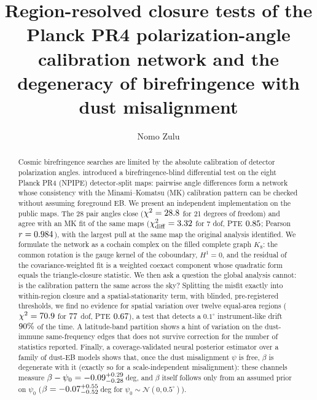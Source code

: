 \documentclass[twocolumn]{aastex631}
\begin{document}
\title{Region-resolved closure tests of the Planck PR4 polarization-angle calibration network and the degeneracy of birefringence with dust misalignment}

\author{Nomo Zulu}

\begin{abstract}
Cosmic birefringence searches are limited by the absolute calibration of detector polarization
angles. \citet{lka2026} introduced a birefringence-blind differential test on the eight Planck PR4
(NPIPE) detector-split maps: pairwise angle differences form a network whose consistency with the
Minami--Komatsu (MK) calibration pattern can be checked without assuming foreground EB.
We present an independent implementation on the public maps. The 28 pair angles close
($\chi^2=28.8$ for 21 degrees of freedom) and agree with an MK fit of the same maps
($\chi^2_{\rm diff}=3.32$ for 7 dof, PTE $0.85$; Pearson $r=0.984$), with the largest
pull at the same map the original analysis identified. We formulate the network as a cochain
complex on the filled complete graph $K_8$: the common rotation is the gauge kernel of the
coboundary, $H^1=0$, and the residual of the covariance-weighted fit is a weighted coexact
component whose quadratic form equals the triangle-closure statistic.
We then ask a question the global analysis cannot: is the calibration pattern the same across the
sky? Splitting the misfit exactly into within-region closure and a spatial-stationarity term,
with blinded, pre-registered thresholds, we find no evidence for spatial variation over twelve
equal-area regions ($\chi^2=70.9$ for $77$ dof, PTE $0.67$), a test that detects a
$0.1^\circ$ instrument-like drift $90\%$ of the time. A latitude-band partition shows a
hint of variation on the dust-immune same-frequency edges that does not survive correction for
the number of statistics reported.
Finally, a coverage-validated neural posterior estimator over a family of dust-EB models shows
that, once the dust misalignment $\psi$ is free, $\beta$ is degenerate with it (exactly so for a
scale-independent misalignment): these channels measure $\beta-\psi_0=-0.09^{+0.29}_{-0.28}$\,deg, and $\beta$ itself follows only from
an assumed prior on $\psi_0$ ($\beta=-0.07^{+0.55}_{-0.52}$\,deg for
$\psi_0\sim\mathcal N(0,0.5^\circ)$).
\end{abstract}

\end{document}
